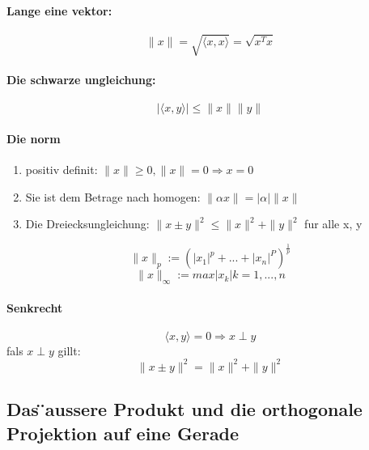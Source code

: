 \documentclass[11pt]{article}
\begin{document}
\paragraph{Lange eine vektor:}
\begin{equation}
	\parallel x\parallel=\sqrt{\langle x,x\rangle}=\sqrt{x^Tx}
\end{equation}
\paragraph{Die schwarze ungleichung:}
\begin{equation}
	|\langle x,y\rangle|\le \parallel x\parallel \parallel y\parallel 
\end{equation}
\paragraph{Die norm}
\begin{enumerate}
	\item positiv definit: $\parallel x\parallel \ge 0, \parallel x\parallel =0 \Rightarrow x=0$
	\item Sie ist dem Betrage nach homogen: $\parallel \alpha x\parallel = |\alpha|\parallel x\parallel $
	\item Die Dreiecksungleichung: $\parallel x\pm y\parallel^2 \le \parallel x\parallel^2 +\parallel y\parallel^2$ fur alle x, y
\end{enumerate}
\begin{equation}
	\parallel x\parallel _p:=(|x_1|^p+...+|x_n|^P)^\frac{1}{p}
\end{equation}
\begin{equation}
	\parallel x\parallel _{\infty}:= max |x_k| k=1,...,n
\end{equation}
\paragraph{Senkrecht}
\begin{equation}
	\langle x,y\rangle=0 \Rightarrow x\perp y
\end{equation}
fals $x\perp y$ gillt:
\begin{equation}
	\parallel x\pm y\parallel^2=\parallel x\parallel^2+\parallel y\parallel^2
\end{equation}
\subsection{Das  ̈aussere Produkt und die orthogonale Projektion auf eine Gerade}
\end{document}
